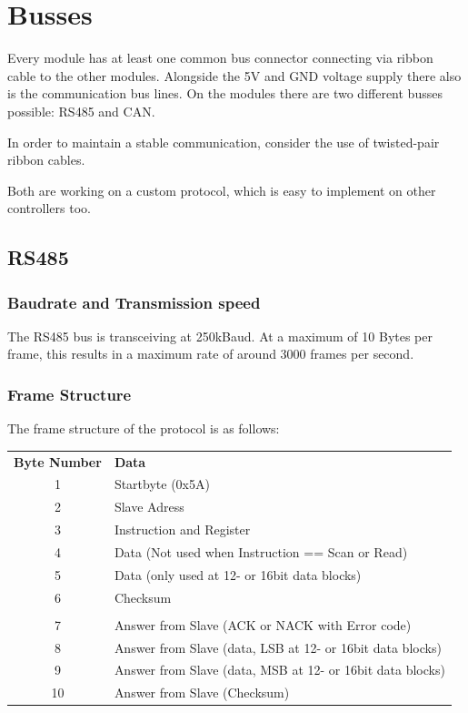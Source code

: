 \chapter{Busses}

Every module has at least one common bus connector connecting via ribbon cable to the other modules. Alongside the 5V and GND voltage supply there also is the communication bus lines. On the modules there are two different busses possible: RS485 and CAN. 

In order to maintain a stable communication, consider the use of twisted-pair ribbon cables.

Both are working on a custom protocol, which is easy to implement on other controllers too. 

\section{RS485}

\subsection{Baudrate and Transmission speed}
The RS485 bus is transceiving at 250kBaud. At a maximum of 10 Bytes per frame, this results in a maximum rate of around 3000 frames per second.

\subsection{Frame Structure}
The frame structure of the protocol is as follows:
\vspace{0.5cm}

\begin{tabular}{cl}
    \textbf{Byte Number}     & \textbf{Data}                      \\
    1               & Startbyte (0x5A)          \\
    2               & Slave Adress              \\
    3               & Instruction and Register  \\
    4               & Data (Not used when Instruction == Scan or Read) \\
    5               & Data (only used at 12- or 16bit data blocks) \\
    6               & Checksum \\
    \\
    7               & Answer from Slave (ACK or NACK with Error code) \\
    8               & Answer from Slave (data, LSB at 12- or 16bit data blocks) \\
    9               & Answer from Slave (data, MSB at 12- or 16bit data blocks) \\
    10              & Answer from Slave (Checksum)
\end{tabular}
\vspace{0.5cm}

